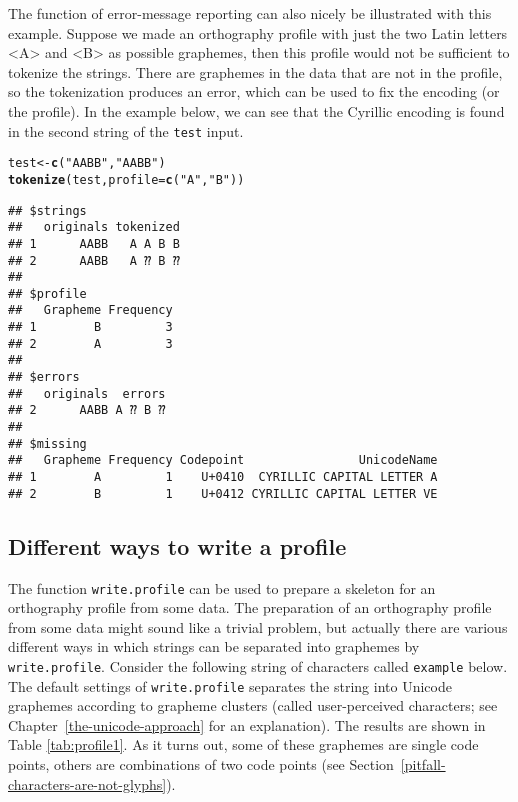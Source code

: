 \documentclass[output=book,nonflat,modfonts,
citecolor=brown,
		]{langsci/langscibook}\usepackage[]{graphicx}\usepackage[]{color}
\makeatletter
\newcommand{\hlstr}[1]{\textcolor[rgb]{0.192,0.494,0.8}{#1}}%
\newcommand{\hlstd}[1]{\textcolor[rgb]{0.345,0.345,0.345}{#1}}%
\newcommand{\hlkwb}[1]{\textcolor[rgb]{0.69,0.353,0.396}{#1}}%
\newcommand{\hlkwc}[1]{\textcolor[rgb]{0.333,0.667,0.333}{#1}}%
\newcommand{\hlkwd}[1]{\textcolor[rgb]{0.737,0.353,0.396}{\textbf{#1}}}%
\newenvironment{kframe}{%
 \def\at@end@of@kframe{}%
 \ifinner\ifhmode%
  \def\at@end@of@kframe{\end{minipage}}%
  \begin{minipage}{\columnwidth}%
 \fi\fi%
 \def\FrameCommand##1{\hskip\@totalleftmargin \hskip-\fboxsep
 \colorbox{shadecolor}{##1}\hskip-\fboxsep
     \hskip-\linewidth \hskip-\@totalleftmargin \hskip\columnwidth}%
 \MakeFramed {\advance\hsize-\width
   \@totalleftmargin\z@ \linewidth\hsize
   \@setminipage}}%
 {\par\unskip\endMakeFramed%
 \at@end@of@kframe}
\newenvironment{knitrout}{}{} %
\makeatother
\begin{document}
The function of error-message reporting can also nicely be illustrated
with this example. Suppose we made an orthography profile with just the two
Latin letters <A> and <B> as possible graphemes, then this profile would not be
sufficient to tokenize the strings. There are graphemes in the data that are not
in the profile, so the tokenization produces an error, which can be used to fix
the encoding (or the profile). In the example below, we can see that the
Cyrillic encoding is found in the second string of the \texttt{test} input.

\begin{knitrout}\footnotesize
{}\color{fgcolor}\begin{kframe}
\begin{alltt}
\hlstd{test} \hlkwb{<-} \hlkwd{c}\hlstd{(}\hlstr{"AABB"}\hlstd{,} \hlstr{"AАBВ"}\hlstd{)}
\hlkwd{tokenize}\hlstd{(test,} \hlkwc{profile} \hlstd{=} \hlkwd{c}\hlstd{(}\hlstr{"A"}\hlstd{,} \hlstr{"B"}\hlstd{))}
\end{alltt}


{\ttfamily\noindent{}}\begin{verbatim}
## $strings
##   originals tokenized
## 1      AABB   A A B B
## 2      AАBВ   A ⁇ B ⁇
## 
## $profile
##   Grapheme Frequency
## 1        B         3
## 2        A         3
## 
## $errors
##   originals  errors
## 2      AАBВ A ⁇ B ⁇
## 
## $missing
##   Grapheme Frequency Codepoint                UnicodeName
## 1        А         1    U+0410  CYRILLIC CAPITAL LETTER A
## 2        В         1    U+0412 CYRILLIC CAPITAL LETTER VE
\end{verbatim}
\end{kframe}
\end{knitrout}

\subsection*{Different ways to write a profile}
\label{write-profile}

The function \texttt{write.profile} can be used to prepare a skeleton for an
orthography profile from some data. The preparation of an orthography profile
from some data might sound like a trivial problem, but actually there are
various different ways in which strings can be separated into graphemes by
\texttt{write.profile}. Consider the following string of characters called
\texttt{example} below. The default settings of \texttt{write.profile} separates
the string into Unicode graphemes according to grapheme clusters (called user-perceived characters; see Chapter~\ref{the-unicode-approach} for an explanation). The results are shown 
in Table \ref {tab:profile1}. As it 
turns out, some of these graphemes are single code points, others are combinations
of two code points (see Section~\ref{pitfall-characters-are-not-glyphs}).
\end{document}
